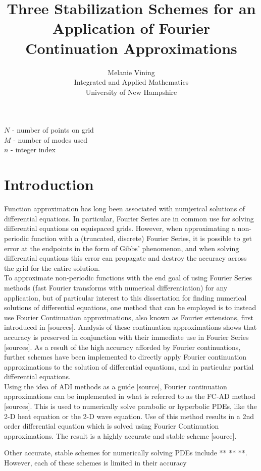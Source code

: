 \documentclass[11pt]{amsart}
\title{Three Stabilization Schemes for an Application of Fourier Continuation Approximations}
\author{Melanie Vining \\ Integrated and Applied Mathematics \\University of New Hampshire}
\begin{document}
\maketitle
\newpage
$N$ - number of points on grid\\
$M$ - number of modes used\\
$n$ - integer index\\


\newpage


\section{Introduction}
Function approximation has long been associated with numjerical solutions of differential equations.  In particular, Fourier Series are in common use for solving differential equations on equispaced grids. However, when approximating a non-periodic function with a (truncated, discrete) Fourier Series, it is possible to get error at the endpoints in the form of Gibbs' phenomenon, and when solving differential equations this error can propagate and destroy the accuracy across the grid for the entire solution.  \\
To approximate non-periodic functions with the end goal of using Fourier Series methods (fast Fourier transforms with numerical differentiation) for any application, but of particular interest to this dissertation for finding numerical solutions of differential equations, one method that can be employed is to instead use Fourier Continuation approximations, also known as Fourier extensions, first introduced in [sources].  Analysis of these continuation approximations shows that accuracy is preserved in conjunction with their immediate use in Fourier Series [sources]. As a result of the high accuracy afforded by Fourier continuations, further schemes have been implemented to directly apply Fourier continuation approximations to the solution of differential equations, and in particular partial differential equations. \\
Using the idea of ADI methods as a guide [source], Fourier continuation approximations can be implemented in what is referred to as the FC-AD method [sources].  This is used to numerically solve parabolic or hyperbolic PDEs, like the 2-D heat equation or the 2-D wave equation.  Use of this method results in a 2nd order differential equation which is solved using Fourier Continuation approximations.  The result is a highly accurate and stable scheme [source]. 

Other accurate, stable schemes for numerically solving PDEs include ** ** **.  However, each of these schemes is limited in their accuracy 
\end{document}

